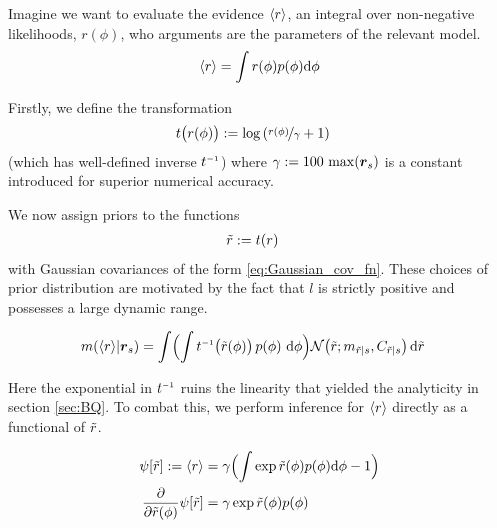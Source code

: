 \documentclass{article}
\begin{document}
Imagine we want to evaluate the evidence $\inty{r}$, an integral over non-negative likelihoods, $r(\phi)$, who arguments are the parameters of the relevant model.
$$
\inty{r} = \int r(\phi) p(\phi) \ud\phi
$$

Firstly, we define the transformation
\begin{align*}
t\bigl(r(\phi)\bigr) & \deq \log\left(\nicefrac{r(\phi)}{\gamma} + 1\right)
\end{align*}
(which has well-defined inverse $t\inv$) where 
$
 \gamma \deq 100\, \max(\vr_s)
$
is a constant introduced for superior numerical accuracy.

We now assign \gpb priors to the functions
\begin{align*}
 \tr & \deq  t(r)
\end{align*}
with Gaussian
covariances of the form \eqref{eq:Gaussian_cov_fn}.
These choices of prior distribution are motivated by the fact that
$l$ is strictly positive and possesses a large dynamic
range. 


\begin{align}
\mean{\inty{r}}{\vr_s}
&  =\int \Bigl( \int t\inv\bigr(\tr(\phi)\bigl)\,\po{\phi}\,\ud\phi\Bigr)
\N{\tr}{\meancondfn{\tr}{s}}{\covcondfn{\tr}{s}} \ud \tr \nonumber
\end{align}

Here the exponential in $t\inv$ ruins the linearity that yielded the analyticity in section \ref{sec:BQ}. To combat this, we perform inference for $\inty{r}$ directly as a functional of $\tr$.

\begin{align*}
 \psi[\tr] \deq \inty{r} & = \gamma\Bigl(\int  \exp \tr(\phi) p(\phi) \ud \phi-1\Bigr)\\
\pderiv{}{\tr(\phi)}\psi[\tr] & = \gamma \exp \tr(\phi) p(\phi)
\end{align*}
\end{document}
